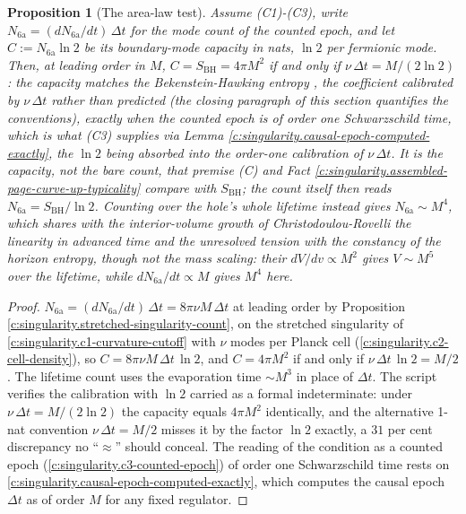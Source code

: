 \documentclass[11pt]{article}
\newtheorem{proposition}[theorem]{Proposition}
\theoremstyle{definition}
\theoremstyle{plain}
\newcommand{\changedmark}[2]{\marginpar{\raggedright\scriptsize\color{#1}#2}}
\begin{document}
\begin{proposition}[The area-law test]\label{c:singularity.area-law-test}
\changedmark{gray}{reworded}
Assume (C1)-(C3), write $N_{\mathrm{6a}} = (dN_{\mathrm{6a}}/dt)\,\Delta t$ for the mode count of the counted epoch, and let $C := N_{\mathrm{6a}}\ln 2$ be its boundary-mode capacity in nats, $\ln 2$ per fermionic mode. Then, at leading order in $M$, $C = S_{\mathrm{BH}} = 4\pi M^2$ if and only if $\nu\,\Delta t = M/(2\ln 2)$: the capacity matches the Bekenstein-Hawking entropy \cite{Bekenstein1973, Hawking1975}, the coefficient calibrated by $\nu\,\Delta t$ rather than predicted (the closing paragraph of this section quantifies the conventions), exactly when the counted epoch is of order one Schwarzschild time, which is what (C3) supplies via Lemma \ref{c:singularity.causal-epoch-computed-exactly}, the $\ln 2$ being absorbed into the order-one calibration of $\nu\,\Delta t$. It is the capacity, not the bare count, that premise (C) and Fact \ref{c:singularity.assembled-page-curve-up-typicality} compare with $S_{\mathrm{BH}}$; the count itself then reads $N_{\mathrm{6a}} = S_{\mathrm{BH}}/\ln 2$. Counting over the hole's whole lifetime instead gives $N_{\mathrm{6a}} \sim M^4$, which shares with the interior-volume growth of Christodoulou-Rovelli \cite{CR2015} the linearity in advanced time and the unresolved tension with the constancy of the horizon entropy, though not the mass scaling: their $dV/dv \propto M^{2}$ gives $V \sim M^{5}$ over the lifetime, while $dN_{\mathrm{6a}}/dt \propto M$ gives $M^{4}$ here.
\end{proposition}
\begin{proof}
$N_{\mathrm{6a}} = (dN_{\mathrm{6a}}/dt)\,\Delta t = 8\pi\nu M\,\Delta t$ at leading order by Proposition \ref{c:singularity.stretched-singularity-count}, on the stretched singularity of \ref{c:singularity.c1-curvature-cutoff} with $\nu$ modes per Planck cell (\ref{c:singularity.c2-cell-density}), so $C = 8\pi\nu M\,\Delta t\,\ln 2$, and $C = 4\pi M^{2}$ if and only if $\nu\,\Delta t\,\ln 2 = M/2$. The lifetime count uses the evaporation time $\sim M^{3}$ in place of $\Delta t$. The script verifies the calibration with $\ln 2$ carried as a formal indeterminate: under $\nu\,\Delta t = M/(2\ln 2)$ the capacity equals $4\pi M^{2}$ identically, and the alternative 1-nat convention $\nu\,\Delta t = M/2$ misses it by the factor $\ln 2$ exactly, a $31$ per cent discrepancy no ``$\approx$'' should conceal. The reading of the condition as a counted epoch (\ref{c:singularity.c3-counted-epoch}) of order one Schwarzschild time rests on \ref{c:singularity.causal-epoch-computed-exactly}, which computes the causal epoch $\Delta t$ as of order $M$ for any fixed regulator.

\end{proof}
\end{document}
